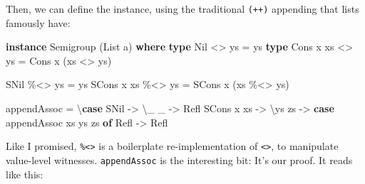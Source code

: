 \documentclass[]{article}
\newenvironment{Shaded}{}{}
\newcommand{\DataTypeTok}[1]{\textcolor[rgb]{0.56,0.13,0.00}{#1}}
\newcommand{\KeywordTok}[1]{\textcolor[rgb]{0.00,0.44,0.13}{\textbf{#1}}}
\newcommand{\NormalTok}[1]{#1}
\newcommand{\OperatorTok}[1]{\textcolor[rgb]{0.40,0.40,0.40}{#1}}
\newcommand{\OtherTok}[1]{\textcolor[rgb]{0.00,0.44,0.13}{#1}}
\begin{document}
Then, we can define the instance, using the traditional \texttt{(++)} appending
that lists famously have:

\begin{Shaded}
\begin{Highlighting}[]
\KeywordTok{instance} \DataTypeTok{Semigroup}\NormalTok{ (}\DataTypeTok{List}\NormalTok{ a) }\KeywordTok{where}
    \KeywordTok{type} \DataTypeTok{Nil}       \OperatorTok{\textless{}\textgreater{}}\NormalTok{ ys }\OtherTok{=}\NormalTok{ ys}
    \KeywordTok{type} \DataTypeTok{Cons}\NormalTok{ x xs }\OperatorTok{\textless{}\textgreater{}}\NormalTok{ ys }\OtherTok{=} \DataTypeTok{Cons}\NormalTok{ x (xs }\OperatorTok{\textless{}\textgreater{}}\NormalTok{ ys)}

    \DataTypeTok{SNil}       \OperatorTok{\%\textless{}\textgreater{}}\NormalTok{ ys }\OtherTok{=}\NormalTok{ ys}
    \DataTypeTok{SCons}\NormalTok{ x xs }\OperatorTok{\%\textless{}\textgreater{}}\NormalTok{ ys }\OtherTok{=} \DataTypeTok{SCons}\NormalTok{ x (xs }\OperatorTok{\%\textless{}\textgreater{}}\NormalTok{ ys)}

\NormalTok{    appendAssoc }\OtherTok{=}\NormalTok{ \textbackslash{}}\KeywordTok{case}
      \DataTypeTok{SNil}       \OtherTok{{-}\textgreater{}}\NormalTok{ \textbackslash{}\_ \_ }\OtherTok{{-}\textgreater{}} \DataTypeTok{Refl}
      \DataTypeTok{SCons}\NormalTok{ x xs }\OtherTok{{-}\textgreater{}}\NormalTok{ \textbackslash{}ys zs }\OtherTok{{-}\textgreater{}}
        \KeywordTok{case}\NormalTok{ appendAssoc xs ys zs }\KeywordTok{of}
          \DataTypeTok{Refl} \OtherTok{{-}\textgreater{}} \DataTypeTok{Refl}
\end{Highlighting}
\end{Shaded}

Like I promised, \texttt{\%\textless{}\textgreater{}} is a boilerplate
re-implementation of \texttt{\textless{}\textgreater{}}, to manipulate
value-level witnesses. \texttt{appendAssoc} is the interesting bit: It's our
proof. It reads like this:
\end{document}
